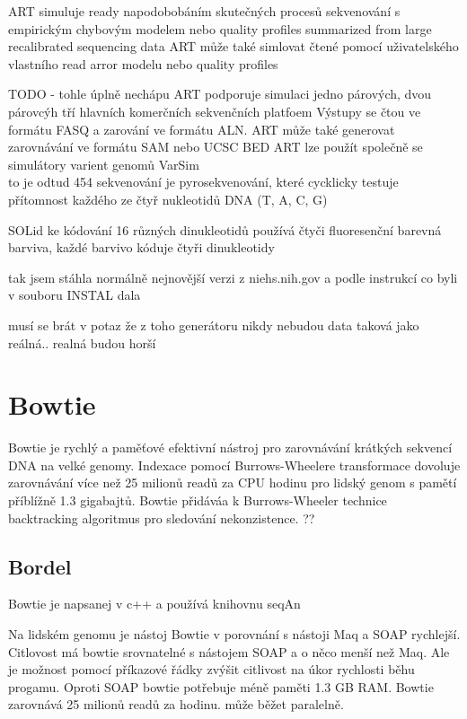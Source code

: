 \documentclass[czech,DP]{thesiskiv}
\begin{document}
ART simuluje ready napodobobáním skutečných procesů sekvenování s empirickým chybovým modelem nebo quality profiles summarized from large recalibrated sequencing data
ART může také simlovat čtené pomocí uživatelského vlastního read arror modelu nebo quality profiles

TODO - tohle úplně nechápu ART podporuje simulaci jedno párových, dvou párovcýh tří hlavních komerčních sekvenčních platfoem 
Výstupy se čtou ve formátu FASQ a zarování ve formátu ALN. 
ART může také generovat zarovnávání ve formátu SAM nebo UCSC BED
ART lze použít společně se simulátory varient genomů VarSim 
\\
to je odtud %
454 sekvenování je pyrosekvenování, které cycklicky testuje přítomnost každého ze čtyř nukleotidů DNA (T, A, C, G)

SOLid ke kódování 16 různých dinukleotidů používá čtyči fluoresenční barevná barviva, každé barvivo kóduje čtyři dinukleotidy
 


tak jsem stáhla normálně nejnovější verzi z niehs.nih.gov a podle instrukcí co byli v souboru INSTAL dala %


musí se brát v potaz že z toho generátoru nikdy nebudou data taková jako reálná.. realná budou horší 




\section{Bowtie}
Bowtie je rychlý a paměťové efektivní nástroj pro zarovnávání krátkých sekvencí DNA na velké genomy. Indexace pomocí Burrows-Wheelere transformace dovoluje zarovnávání více než 25 milionů readů za CPU hodinu pro lidský genom s pamětí příblížně 1.3 gigabajtů. Bowtie přidáváa k Burrows-Wheeler technice backtracking algoritmus pro sledování nekonzistence. ??


\subsection{Bordel}
Bowtie je napsanej v c++ a používá knihovnu seqAn

Na lidském genomu je nástoj Bowtie v porovnání s nástoji Maq a SOAP rychlejší. 
Citlovost má bowtie srovnatelné s nástojem SOAP a o něco menší než Maq. Ale je možnost pomocí příkazové řádky zvýšit citlivost na úkor rychlosti běhu progamu.
Oproti SOAP bowtie potřebuje méně paměti 1.3 GB RAM. 
Bowtie zarovnává  25 milionů readů za hodinu. může běžet paralelně.
\end{document}
